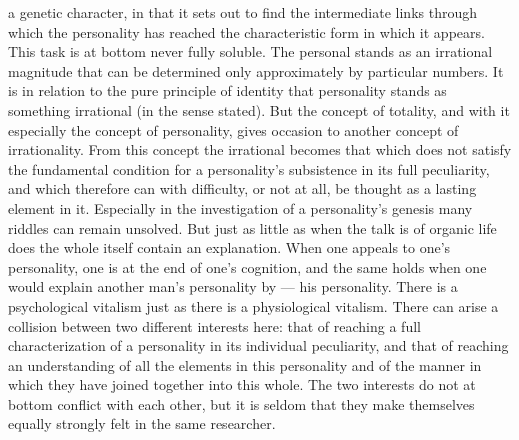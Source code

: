 \documentclass[12pt]{book}
\newcommand{\opage}[1]{\marginnote{\footnotesize\textit{[#1]}}}
\begin{document}
a genetic character, in that it sets out to find the intermediate links through which the personality
has reached the characteristic form in which it appears. This task is at bottom never fully soluble. The
personal stands as an irrational magnitude that can be determined only approximately by particular
numbers. It is in relation to the pure principle of identity that personality stands as something
irrational (in the sense stated). But the concept of totality, and with it especially the concept of
personality, gives occasion to another concept of irrationality. From this concept the irrational
becomes that which does not satisfy the fundamental condition for a personality's subsistence in its
full peculiarity, and which therefore can with difficulty, or not at all, be thought as a lasting
element in it. Especially in the investigation of a personality's genesis many riddles can remain
unsolved. But just as little as when the talk is of organic life does the whole itself contain an
explanation. When one appeals to one's personality, one is at the end of one's cognition, and the same
holds when one would explain another man's personality by --- his personality. There is a psychological
vitalism just as there is a physiological vitalism. There can \opage{44}arise a collision between two different
interests here: that of reaching a full characterization of a personality in its individual peculiarity,
and that of reaching an understanding of all the elements in this personality and of the manner in which
they have joined together into this whole. The two interests do not at bottom conflict with each other,
but it is seldom that they make themselves equally strongly felt in the same researcher.
\end{document}
